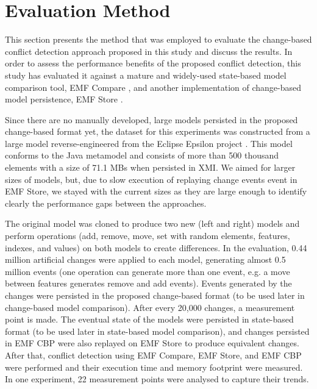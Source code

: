 \section{Evaluation Method}
\label{sec:evaluation_method}
This section presents the method that was employed to evaluate the change-based conflict detection approach proposed in this study and discuss the results. In order to assess the performance benefits of the proposed conflict detection, this study has evaluated it against a mature and widely-used state-based model comparison tool, EMF Compare \cite{emfcompare2018developer,eclipse2017compare}, and another implementation of change-based model persistence, EMF Store \cite{koegel2010emfstore}.

Since there are no manually developed, large models persisted in the proposed change-based format yet, the dataset for this experiments was constructed from a large model reverse-engineered from the Eclipse Epsilon project \cite{eclipse2018epsilongit,eclipse2017epsilon}. This model conforms to the Java metamodel \cite{eclipse2018modiscojava} and consists of more than 500 thousand elements with a size of 71.1 MBs when persisted in XMI. We aimed for larger sizes of models, but, due to slow execution of replaying change events event in EMF Store, we stayed with the current sizes as they are large enough to identify clearly the performance gaps between the approaches.

The original model was cloned to produce two new (left and right) models and perform operations (\textsf{add}, \textsf{remove}, \textsf{move}, \textsf{set} with random elements, features, indexes, and values) on both models to create differences. In the evaluation, 0.44 million artificial changes were applied to each model, generating almost 0.5 million events (one operation can generate more than one event, e.g. a \textsf{move} between features generates \textsf{remove} and \textsf{add} events). Events generated by the changes were persisted in the proposed change-based format (to be used later in change-based model comparison). After every 20,000 changes, a measurement point is made. The eventual state of the models were persisted in state-based format (to be used later in state-based model comparison), and changes persisted in EMF CBP were  also replayed on EMF Store to produce equivalent changes. After that, conflict detection using EMF Compare, EMF Store, and EMF CBP were performed and their execution time and memory footprint were measured. In one experiment, 22 measurement points were analysed to capture their trends. 

